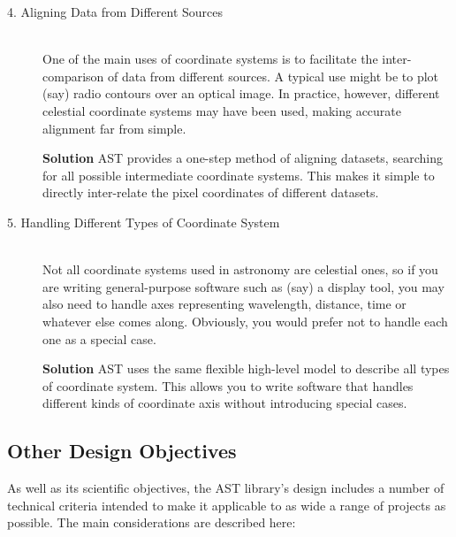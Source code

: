\documentclass[twoside,11pt]{article}
\newcommand{\htmlref}[2]{#1}
\begin{document}
\begin{description}
\item[4. Aligning Data from Different Sources]\mbox{}\\
One of the main uses of coordinate systems is to facilitate the
inter-comparison of data from different sources. A typical use might
be to plot (say) radio contours over an optical image.  In practice,
however, different celestial coordinate systems may have been used,
making accurate alignment far from simple.

{\bf{Solution}} AST provides a one-step method of aligning datasets,
searching for all possible intermediate coordinate systems.  This
makes it simple to directly inter-relate the pixel coordinates of
different datasets.

\item[5. Handling Different Types of Coordinate \htmlref{System}{System}]\mbox{}\\
Not all coordinate systems used in astronomy are celestial ones, so if
you are writing general-purpose software such as (say) a display tool,
you may also need to handle axes representing wavelength, distance,
time or whatever else comes along. Obviously, you would prefer not to
handle each one as a special case.

{\bf{Solution}} AST uses the same flexible high-level model to
describe all types of coordinate system. This allows you to write
software that handles different kinds of coordinate axis without
introducing special cases.
\end{description}

\subsection{Other Design Objectives}

As well as its scientific objectives, the AST library's design
includes a number of technical criteria intended to make it applicable
to as wide a range of projects as possible. The main considerations
are described here:
\end{document}
